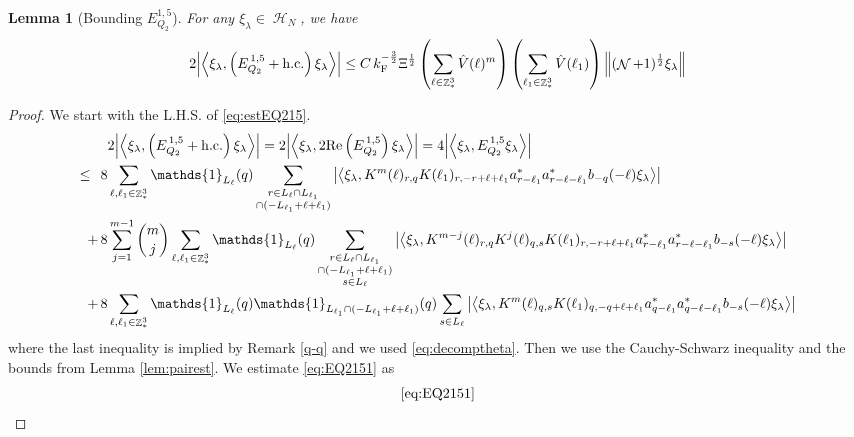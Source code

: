 \documentclass[12pt,a4paper]{article}
\numberwithin{equation}{section}
\newcommand{\1}{\mathbb{I}}
\newcommand{\F}{\mathrm{F}}
\DeclareMathOperator{\Z}{\mathbb{Z}}
\DeclareMathOperator{\HH}{\mathcal{H}}
\DeclareMathOperator{\NN}{\mathcal{N}}
\newcommand{\half}{\frac{1}{2}}
\newcommand{\eva}[1]{\left\langle #1 \right\rangle}
\theoremstyle{plain}
\newtheorem{lemma}[theorem]{Lemma}
\theoremstyle{definition}
\theoremstyle{remark}
\theoremstyle{plain}
\theoremstyle{definition}
\theoremstyle{remark}
\begin{document}
\begin{lemma}[Bounding $E_{Q_2}^{1,5}$]\label{lem:EQ215}
For any $\xi_\lambda \in \HH_N$, we have
	\begin{align}
    	2\abs{\eva{\xi_\lambda,\left(E^{\,1,5}_{Q_2}+\mathrm{h.c.}\right) \xi_\lambda }}
    	\leq C\, k_{\F}^{-\frac{3}{2}} \Xi^{\half} \left(\sum\limits_{\ell\in \Z^3_*} \hat{V}(\ell)^m \right) \left(\sum\limits_{\ell_1\in \Z^3_*} \hat{V}(\ell_1) \right) \norm{(\NN+1)^\half \xi_\lambda } \label{eq:estEQ215}
    \end{align}
\end{lemma}
\begin{proof}
We start with the L.H.S. of \eqref{eq:estEQ215}.
\begin{align}
    &2\abs{\eva{\xi_\lambda,\left(E^{\,1,5}_{Q_2}+\mathrm{h.c.}\right) \xi_\lambda }} = 2\abs{\eva{\xi_\lambda,2\mathrm{Re}\left(E^{\,1,5}_{Q_2}\right) \xi_\lambda }} = 4\abs{\eva{\xi_\lambda, E^{\,1,5}_{Q_2} \xi_\lambda }}\nonumber\\
    \leq\,\;8& \sum\limits_{\ell, \ell_1\in \Z^3_*} \mathds{1}_{L_{\ell}}(q) \sum\limits_{\substack{r\in L_{\ell} \cap L_{\ell_1} \\ \cap (-L_{\ell_1}+\ell+\ell_1)}} \abs{\eva{\xi_\lambda,  K^m(\ell)_{r,q} K(\ell_1)_{r,-r+\ell+\ell_1}  a^*_{r-\ell_1}a^*_{r-\ell-\ell_1}b_{-q}(-\ell)\xi_\lambda }} \label{eq:EQ2151}\\
    +\,8& \sum\limits_{j=1}^{m-1} {{m}\choose j} \sum\limits_{\ell, \ell_1\in \Z^3_*}\mathds{1}_{L_{\ell}}(q) \sum\limits_{\substack{r\in L_{\ell} \cap L_{\ell_1}\\ \cap (-L_{\ell_1}+\ell+\ell_1)\\ s \in L_{\ell}}}  \abs{\eva{\xi_\lambda, K^{m-j}(\ell)_{r,q} K^j(\ell)_{q,s} K(\ell_1)_{r,-r+\ell+\ell_1}  a^*_{r-\ell_1}a^*_{r-\ell-\ell_1}b_{-s}(-\ell) \xi_\lambda }} \label{eq:EQ2152}\\
    +\,8&\sum\limits_{\ell, \ell_1\in \Z^3_*} \mathds{1}_{L_{\ell}}(q) \mathds{1}_{L_{\ell_1}\cap (-L_{\ell_1}+\ell+\ell_1)}(q) \sum\limits_{ s \in L_{\ell}} \abs{\eva{\xi_\lambda, K^m(\ell)_{q,s} K(\ell_1)_{q,-q+\ell+\ell_1}  a^*_{q-\ell_1} a^*_{q-\ell-\ell_1} b_{-s}(-\ell) \xi_\lambda }} \label{eq:EQ2153}
\end{align}
where the last inequality is implied by Remark \ref{q-q} and we used \eqref{eq:decomptheta}.
Then we use the Cauchy-Schwarz inequality and the bounds from Lemma \ref{lem:pairest}.
We estimate \eqref{eq:EQ2151} as
\begin{align}
    &\eqref{eq:EQ2151}\nonumber\\

\end{align}
\end{proof}
\end{document}
